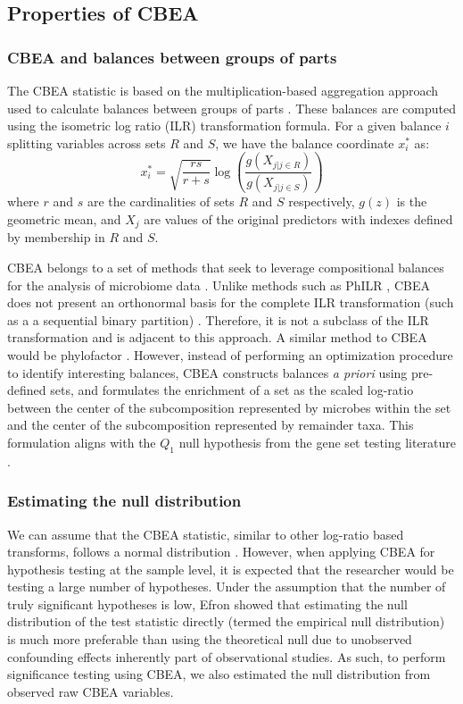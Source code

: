 \subsection{Properties of CBEA}
\subsubsection{CBEA and balances between groups of parts}
The CBEA statistic is based on the multiplication-based aggregation approach used to calculate balances between groups of parts \cite{egozcue2005}. These balances are computed using the isometric log ratio (ILR) transformation \cite{egozcue2003} formula. For a given balance $i$ splitting variables across sets $R$ and $S$, we have the balance coordinate $x^{*}_{i}$ as: 
\begin{equation}\label{ilr_standard}
    x^{*}_i = \sqrt{\frac{rs}{r+s}} \log\left(\frac{g(X_{j|j \in R})}{g(X_{j|j \in S})}\right)
\end{equation}
where $r$ and $s$ are the cardinalities of sets $R$ and $S$ respectively, $g(z)$ is the geometric mean, and $X_{j}$ are values of the original predictors with indexes defined by membership in $R$ and $S$. 

CBEA belongs to a set of methods that seek to leverage compositional balances for the analysis of microbiome data \cite{washburne2017, rivera-pinto2018, silverman2017, morton2017}. Unlike methods such as PhILR \cite{silverman2017}, CBEA does not present an orthonormal basis for the complete ILR transformation (such as a a sequential binary partition) \cite{egozcue2003}. Therefore, it is not a subclass of the ILR transformation and is adjacent to this approach. A similar method to CBEA would be phylofactor \cite{washburne2017}. However, instead of performing an optimization procedure to identify interesting balances, CBEA constructs balances \emph{a priori} using pre-defined sets, and formulates the enrichment of a set as the scaled log-ratio between the center of the subcomposition represented by microbes within the set and the center of the subcomposition represented by remainder taxa. This formulation aligns with the $Q_1$ null hypothesis from the gene set testing literature \cite{tian2005}. 

\subsubsection{Estimating the null distribution}
We can assume that the CBEA statistic, similar to other log-ratio based transforms, follows a normal distribution \cite{egozcue2003, aitchison1980}. However, when applying CBEA for hypothesis testing at the sample level, it is expected that the researcher would be testing a large number of hypotheses. Under the assumption that the number of truly significant hypotheses is low, Efron \cite{efron2004} showed that estimating the null distribution of the test statistic directly (termed the empirical null distribution) is much more preferable than using the theoretical null due to unobserved confounding effects inherently part of observational studies. As such, to perform significance testing using CBEA, we also estimated the null distribution from observed raw CBEA variables. 

